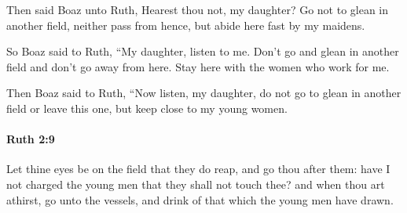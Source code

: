 			\begin{versebox}
					\item[BHS] 
					\item[LXX] 
					\item[ASV] Then said Boaz unto Ruth, Hearest thou not, my daughter? Go not to glean in another field, neither pass from hence, but abide here fast by my maidens.
					\item[NIV] So Boaz said to Ruth, “My daughter, listen to me. Don’t go and glean in another field and don’t go away from here. Stay here with the women who work for me.
					\item[NRSV] Then Boaz said to Ruth, “Now listen, my daughter, do not go to glean in another field or leave this one, but keep close to my young women.
			\end{versebox}

		\paragraph{Ruth 2:9} %
			\label{RUTH-2-9}

			Let thine eyes be on the field that they do reap, and go thou after them: have I not charged the young men that they shall not touch thee? and when thou art athirst, go unto the vessels, and drink of that which the young men have drawn.

